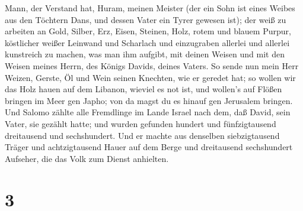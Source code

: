 Mann, der Verstand hat, Huram, meinen Meister  (der ein
Sohn ist eines Weibes aus den Töchtern Dans, und dessen Vater ein Tyrer
gewesen ist); der weiß zu arbeiten an Gold, Silber, Erz, Eisen, Steinen,
Holz, rotem und blauem Purpur, köstlicher weißer Leinwand und Scharlach
und einzugraben allerlei und allerlei kunstreich zu machen, was man ihm
aufgibt, mit deinen Weisen und mit den Weisen meines Herrn, des Königs
Davids, deines Vaters.  So sende nun mein Herr Weizen,
Gerste, Öl und Wein seinen Knechten, wie er geredet hat; 
so wollen wir das Holz hauen auf dem Libanon, wieviel es not ist, und
wollen's auf Flößen bringen im Meer gen Japho; von da magst du es hinauf
gen Jerusalem bringen.  Und Salomo zählte alle Fremdlinge
im Lande Israel nach dem, daß David, sein Vater, sie gezählt hatte; und
wurden gefunden hundert und fünfzigtausend dreitausend und sechshundert.
 Und er machte aus denselben siebzigtausend Träger und
achtzigtausend Hauer auf dem Berge und dreitausend sechshundert
Aufseher, die das Volk zum Dienst anhielten.

\hypertarget{section-2}{%
\section{3}\label{section-2}}

